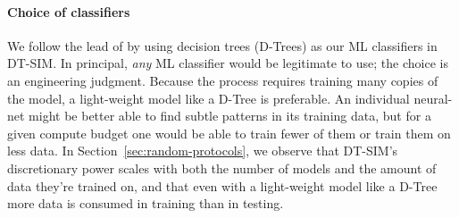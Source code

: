 \documentclass[acmlarge, manuscript, screen, review, anonymous, table]{acmart}
\newcommand{\toolname}{\textsc{DT-SIM}\xspace}
\begin{document}
\paragraph{Choice of classifiers}
We follow the lead of \cite{chalupka2018fast} by using decision trees (D-Trees) as our ML classifiers in \toolname.
In principal, \emph{any} ML classifier would be legitimate to use;
the choice is an engineering judgment.
Because the process requires training many copies of the model, a light-weight model like a D-Tree is preferable.
An individual neural-net might be better able to find subtle patterns in its training data,
but for a given compute budget one would be able to train fewer of them or train them on less data.
In Section~\ref{sec:random-protocols}, we observe that \toolname's discretionary power scales with both the number of models
and the amount of data they're trained on,
and that even with a light-weight model like a D-Tree more data is consumed in training than in testing.
\end{document}
